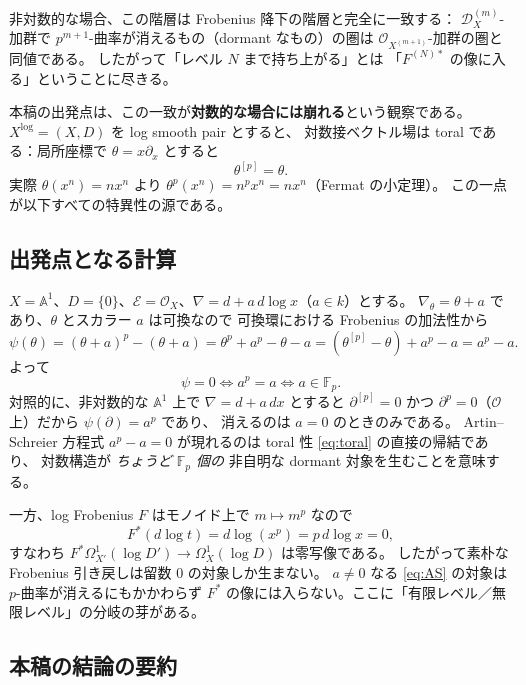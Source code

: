 \documentclass[a4paper,11pt]{ltjsarticle}
\theoremstyle{plain}
\theoremstyle{definition}
\newcommand{\bbA}{\mathbb{A}}
\newcommand{\bbF}{\mathbb{F}}
\newcommand{\cD}{\mathcal{D}}
\newcommand{\cE}{\mathcal{E}}
\newcommand{\cO}{\mathcal{O}}
\newcommand{\dlog}{d\!\log}
\begin{document}
非対数的な場合、この階層は Frobenius 降下の階層と完全に一致する：
$\cD^{(m)}_X$-加群で $p^{m+1}$-曲率が消えるもの（dormant なもの）の圏は
$\cO_{X^{(m+1)}}$-加群の圏と同値である。
したがって「レベル $N$ まで持ち上がる」とは
「$F^{(N)*}$ の像に入る」ということに尽きる。

本稿の出発点は、この一致が\textbf{対数的な場合には崩れる}という観察である。
$X^{\log}=(X,D)$ を log smooth pair とすると、
対数接ベクトル場は toral である：局所座標で $\theta=x\partial_x$ とすると
\begin{equation}\label{eq:toral}
  \theta^{[p]}=\theta .
\end{equation}
実際 $\theta(x^n)=nx^n$ より $\theta^p(x^n)=n^px^n=nx^n$（Fermat の小定理）。
この一点が以下すべての特異性の源である。

\subsection{出発点となる計算}\label{ss:starting}

$X=\bbA^1$、$D=\{0\}$、$\cE=\cO_X$、$\nabla=d+a\,\dlog x$（$a\in k$）とする。
$\nabla_\theta=\theta+a$ であり、$\theta$ とスカラー $a$ は可換なので
可換環における Frobenius の加法性から
\begin{equation}\label{eq:AS}
  \psi(\theta)=(\theta+a)^p-(\theta+a)
  =\theta^p+a^p-\theta-a
  =(\theta^{[p]}-\theta)+a^p-a
  =a^p-a .
\end{equation}
よって
\[
  \psi=0\iff a^p=a\iff a\in\bbF_p .
\]
対照的に、非対数的な $\bbA^1$ 上で $\nabla=d+a\,dx$ とすると
$\partial^{[p]}=0$ かつ $\partial^p=0$（$\cO$ 上）だから $\psi(\partial)=a^p$ であり、
消えるのは $a=0$ のときのみである。
Artin--Schreier 方程式 $a^p-a=0$ が現れるのは
toral 性 \eqref{eq:toral} の直接の帰結であり、
対数構造が \emph{ちょうど $\bbF_p$ 個の} 非自明な dormant 対象を生むことを意味する。

一方、log Frobenius $F$ はモノイド上で $m\mapsto m^p$ なので
\[
  F^*(\dlog t)=\dlog(x^p)=p\,\dlog x=0 ,
\]
すなわち $F^*\Omega^1_{X'}(\log D')\to\Omega^1_X(\log D)$ は零写像である。
したがって素朴な Frobenius 引き戻しは留数 $0$ の対象しか生まない。
$a\neq0$ なる \eqref{eq:AS} の対象は $p$-曲率が消えるにもかかわらず
$F^*$ の像には入らない。ここに「有限レベル／無限レベル」の分岐の芽がある。

\subsection{本稿の結論の要約}
\end{document}
